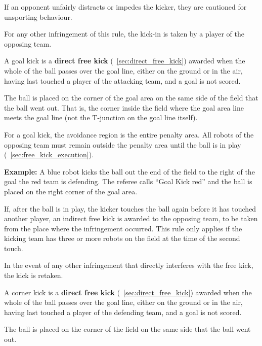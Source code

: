 If an opponent unfairly distracts or impedes the kicker, they are cautioned for unsporting behaviour.

For any other infringement of this rule, the kick-in is taken by a player of the opposing team.

\label{sec:goal_kick}

A goal kick is a \textbf{direct free kick} (\cf~\cref{sec:direct_free_kick}) awarded when the whole of the ball passes over the goal line, either on the ground or in the air, having last touched a player of the attacking team, and a goal is not scored.

The ball is placed on the corner of the goal area on the same side of the field that the ball went out.
That is, the corner inside the field where the goal area line meets the goal line (not the T-junction on the goal line itself).

For a goal kick, the avoidance region is the entire penalty area.
All robots of the opposing team must remain outside the penalty area until the ball is in play (\cf~\cref{sec:free_kick_execution}).

\textbf{Example:} A blue robot kicks the ball out the end of the field to the right of the goal the red team is defending.
The referee calls ``Goal Kick red'' and the ball is placed on the right corner of the goal area.


If, after the ball is in play, the kicker touches the ball again before it has touched another player, an indirect free kick is awarded to the opposing team, to be taken from the place where the infringement occurred. This rule only applies if the kicking team has three or more robots on the field at the time of the second touch.

In the event of any other infringement that directly interferes with the free kick, the kick is retaken.

\label{sec:corner_kick}

A corner kick is a \textbf{direct free kick} (\cf~\cref{sec:direct_free_kick}) awarded when the whole of the ball passes over the goal line, either on the ground or in the air, having last touched a player of the defending team, and a goal is not scored.


The ball is placed on the corner of the field on the same side that the ball went out.

